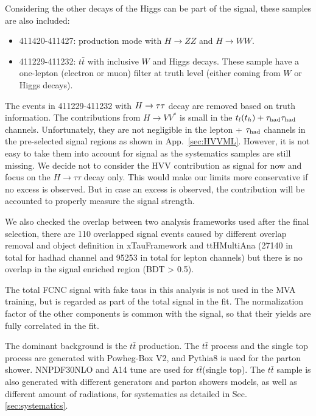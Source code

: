 Considering the other decays of the Higgs can be part of the signal, these samples are also included:

\begin{itemize}
	\item 411420-411427: production mode with $H\to ZZ$ and $H\to WW$.
	\item 411229-411232: $t\bar t$ with inclusive $W$ and Higgs decays. These sample have a one-lepton (electron or muon) filter at truth level (either coming from $W$ or Higgs decays).
\end{itemize}

The events in 411229-411232 with $H \rightarrow \tau\tau$ decay are removed based on truth information. The contributions from $H\rightarrow VV^*$ is small in the $t_l(t_h)+\tau_\text{had}{}\tau_\text{had}$ channels.
Unfortunately, they are not negligible in the lepton + $\tau_\text{had}$ channels in the pre-selected signal regions as shown in App.~\ref{sec:HVVML}.
However, it is not easy to take them into account for signal as the systematics samples are still missing. We decide not to consider the HVV contribution as signal for now
and focus on the $H\rightarrow \tau\tau$ decay only. This would make our limits more conservative if no excess is observed. But in case an excess is observed,
the contribution will be accounted to properly measure the signal strength.

We also checked the overlap between two analysis frameworks used after the final selection,
there are 110 overlapped signal events caused by different overlap removal and object definition in xTauFramework and ttHMultiAna (27140 in total for hadhad channel and 95253 in total for lepton channels) but there is no overlap in the signal enriched region (BDT > 0.5).

The total FCNC signal with fake taus in this analysis is not used in the MVA training, but is regarded as part of the total signal in the fit. The normalization factor of the other components is common with the signal, so that their yields are fully correlated in the fit.

The dominant background is the $t\bar{t}$ production. The $t\bar{t}$ process and the single top process are generated with Powheg-Box \cite{Powheg} V2, and Pythia8 is used for the parton shower. NNPDF30NLO \cite{NNPDF30NLO} and A14 tune \cite{A14} are used for $t\bar{t}$(single top). The $t\bar{t}$ sample is also generated with different generators and parton showers models, as well as different amount of radiations, for systematics as detailed in Sec. \ref{sec:systematics}.

